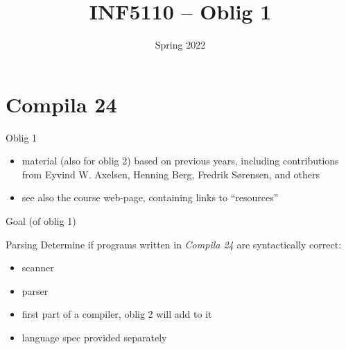 \documentclass{beamer}
\date{Spring 2022}
\title{INF5110 -- Oblig  1}
\renewcommand{\maketitle}{}
\begin{document}
\maketitle
\section{Compila 24}
\label{sec:org65172c1}

\begin{frame}[label={sec:org99605b6}]{Oblig 1}
\begin{itemize}
\item material (also for oblig 2) based on previous years, including contributions from Eyvind
W. Axelsen, Henning Berg, Fredrik Sørensen, and others
\end{itemize}


\begin{itemize}
\item see also the course web-page, containing links to ``resources''
\end{itemize}
\end{frame}
\begin{frame}[label={sec:orgb218816}]{Goal (of oblig 1)}
\begin{block}{Parsing}
Determine if programs written in \emph{Compila 24} are syntactically correct: 

\begin{itemize}
\item scanner
\item parser
\end{itemize}
\end{block}
\begin{itemize}
\item first part of a compiler, oblig 2 will add to it
\item language spec provided separately
\end{itemize}
\end{frame}
\end{document}
